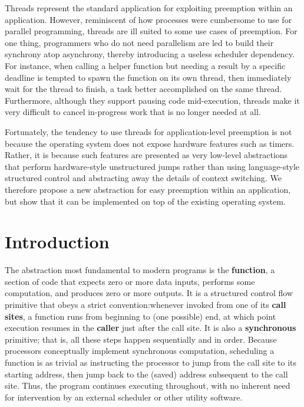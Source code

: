\documentclass[12pt,letterpaper,openright]{report}
\begin{document}
Threads represent the standard application for exploiting preemption within an
application.  However, reminiscent of how processes were cumbersome to use for
parallel programming, threads are ill suited to some use cases of preemption.  For
one thing, programmers who do not need parallelism are led to build their synchrony
atop asynchrony, thereby introducing a useless scheduler dependency.  For instance,
when calling a helper function but needing a result by a specific deadline is tempted
to spawn the function on its own thread, then immediately wait for the thread to
finish, a task better accomplished on the same thread.  Furthermore, although they
support pausing code mid-execution, threads make it very difficult to cancel
in-progress work that is no longer needed at all.

Fortunately, the tendency to use threads for application-level preemption is not
because the operating system does not expose hardware features such as timers.
Rather, it is because such features are presented as very low-level abstractions that
perform hardware-style unstructured jumps rather than using language-style structured
control and abstracting away the details of context switching.  We therefore propose
a new abstraction for easy preemption within an application, but show that it can be
implemented on top of the existing operating system.


\chapter{Introduction}

The abstraction most fundamental to modern programs is the \textbf{function}, a
section of code that expects zero or more data inputs, performs some computation, and
produces zero or more outputs.  It is a structured control flow primitive that obeys
a strict convention:\@ whenever invoked from one of its \textbf{call sites}, a
function runs from beginning to (one possible) end, at which point execution resumes
in the \textbf{caller} just after the call site.  It is also a \textbf{synchronous}
primitive; that is, all these steps happen sequentially and in order.  Because
processors conceptually implement synchronous computation, scheduling a function is
as trivial as instructing the processor to jump from the call site to its starting
address, then jump back to the (saved) address subsequent to the call site.  Thus,
the program continues executing throughout, with no inherent need for intervention by
an external scheduler or other utility software.
\end{document}
